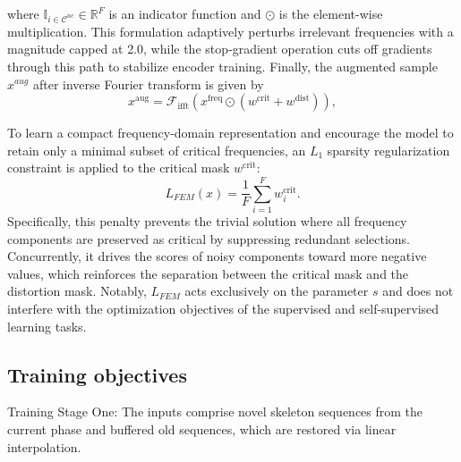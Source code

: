 \documentclass[journal]{IEEEtran}
\begin{document}
where $\mathbb{I}_{i \in \mathcal{C}^{nc}} \in \mathbb{R}^F$ is an indicator function and $\odot$ is the element-wise multiplication.
This formulation adaptively perturbs irrelevant frequencies with a magnitude capped at 2.0, while the stop‑gradient operation cuts off gradients through this path to stabilize encoder training.
Finally, the augmented sample $x^{aug}$ after inverse Fourier transform is given by
\begin{equation}
x^{\text{aug}} = \mathcal{F}_{\text{ifft}} \left( 
     x^{\text{freq}} \odot (w^{\text{crit}} + w^{\text{dist}})
\right),
\end{equation}

To learn a compact frequency-domain representation and encourage the model to retain only a minimal subset of critical frequencies, an $L_1$ sparsity regularization constraint is applied to the critical mask $w^{\text{crit}}$:
\begin{equation}
L_{FEM}(x) = \frac{1}{F} \sum_{i=1}^{F} w_i^{\text{crit}}.
\end{equation}
Specifically, this penalty prevents the trivial solution where all frequency components are preserved as critical by suppressing redundant selections.
Concurrently, it drives the scores of noisy components toward more negative values, which reinforces the separation between the critical mask and the distortion mask.
Notably, $L_{FEM}$ acts exclusively on the parameter $s$ and does not interfere with the optimization objectives of the supervised and self-supervised learning tasks.

\subsection{Training objectives}
Training Stage One: The inputs comprise novel skeleton sequences from the current phase and buffered old sequences, which are restored via linear interpolation.
\end{document}
